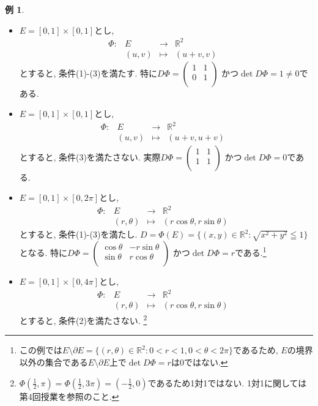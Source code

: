 \documentclass[dvipdfmx,a4paper,11pt]{article}
\newcommand{\R}{\mathbb{R}}
\theoremstyle{definition}
\newtheorem{exa}[thm]{例}
\begin{document}
\begin{exa}
\begin{itemize}
\item $E=[0,1]\times[0,1]$とし, 
 $$
\begin{array}{ccccc}
\Phi: &E & \rightarrow & \R^2 & \\
&(u,v) & \longmapsto & (u+v,v)&
\end{array}
$$
とすると, 条件(1)-(3)を満たす.
特に$
D\Phi=
\left(\begin{array}{cc} 1 &1 \\ 0& 1 \\ \end{array} \right)
$
かつ$\det D\Phi =1 \neq 0$である.

\item $E=[0,1]\times[0,1]$とし, 
 $$
\begin{array}{ccccc}
\Phi: &E & \rightarrow & \R^2 & \\
&(u,v) & \longmapsto & (u+v,u+v)&
\end{array}
$$
とすると, 条件(3)を満たさない.
実際$
D\Phi=
\left(\begin{array}{cc} 1 &1 \\ 1& 1 \\ \end{array} \right)
$
かつ$\det D\Phi =0$である.

\item $E=[0,1]\times[0,2\pi]$とし, 
 $$
\begin{array}{ccccc}
\Phi: &E & \rightarrow & \R^2 & \\
&(r,\theta) & \longmapsto & (r \cos \theta , r \sin \theta)&
\end{array}
$$
とすると, 条件(1)-(3)を満たし. $D = \Phi(E) =  \{ (x,y)\in \R^2 :\sqrt{x^2 + y^2 } \leqq 1  \}$となる.
特に$
D\Phi=
\left(\begin{array}{cc} \cos \theta  &-r \sin \theta \\ \sin \theta& r \cos \theta  \\ \end{array} \right)
$
かつ$\det D\Phi =r$である.\footnote{この例では$E \setminus \partial E = \{ (r,\theta)\in \R^2 : 0 < r<1, 0<\theta <2\pi\}$であるため, $E$の境界以外の集合である$E \setminus\partial E$上で$\det D\Phi =r$は0ではない.}

\item $E=[0,1]\times[0,4\pi]$とし, 
 $$
\begin{array}{ccccc}
\Phi: &E & \rightarrow & \R^2 & \\
&(r,\theta) & \longmapsto & (r \cos \theta , r \sin \theta)&
\end{array}
$$
とすると, 条件(2)を満たさない.
\footnote{$\Phi(\frac{1}{2}, \pi)=\Phi( \frac{1}{2}, 3\pi) =(-\frac{1}{2}, 0)$であるため1対1ではない. 1対1に関しては第4回授業を参照のこと.}
\end{itemize}

\end{exa}
\end{document}
